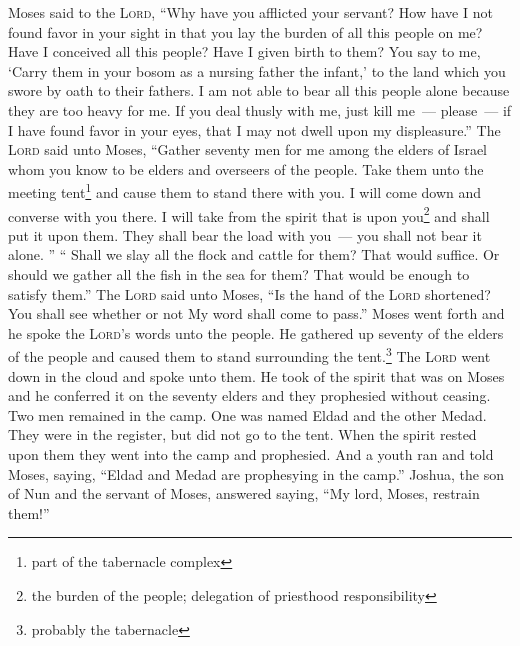 \begin{enumerate}[align=center]
     Moses said to the \textsc{Lord}, ``Why have you afflicted your servant? How have I not found favor in your sight in that you lay the burden of all this people on me?%
     Have I conceived all this people? Have I given birth to them? You say to me, `Carry them in your bosom as a nursing father the infant,' to the land which you swore by oath to their fathers.%
     I am not able to bear all this people alone because they are too heavy for me.%
     If you deal thusly with me, just kill me~--- please~--- if I have found favor in your eyes, that I may not dwell upon my displeasure.''%
     The \textsc{Lord} said unto Moses, ``Gather seventy men for me among the elders of Israel whom you know to be elders and overseers of the people. Take them unto the meeting tent\footnote{part of the tabernacle complex} and cause them to stand there with you.%
     I will come down and converse with you there. I will take from the spirit that is upon you\footnote{the burden of the people; delegation of priesthood responsibility} and shall put it upon them. They shall bear the load with you~--- you shall not bear it alone.%
     ''%
     ``%
     Shall we slay all the flock and cattle for them? That would suffice. Or should we gather all the fish in the sea for them? That would be enough to satisfy them.''%
     The \textsc{Lord} said unto Moses, ``Is the hand of the \textsc{Lord} shortened? You shall see whether or not My word shall come to pass.''%
     Moses went forth and he spoke the \textsc{Lord}'s words unto the people. He gathered up seventy of the elders of the people and caused them to stand surrounding the tent.\footnote{probably the tabernacle}%
     The \textsc{Lord} went down in the cloud and spoke unto them. He took of the spirit that was on Moses and he conferred it on the seventy elders and they prophesied without ceasing.%
     Two men remained in the camp. One was named Eldad and the other Medad. They were in the register, but did not go to the tent. When the spirit rested upon them they went into the camp and prophesied.%
     And a youth ran and told Moses, saying, ``Eldad and Medad are prophesying in the camp.''%
     Joshua, the son of Nun and the servant of Moses, answered saying, ``My lord, Moses, restrain them!''%

\end{enumerate}
